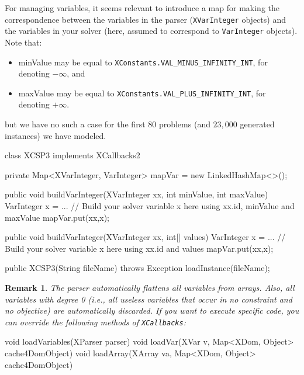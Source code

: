 \documentclass[10pt]{article}
\newenvironment{boxabsc}
               {\medskip \begin{bclogo}[barre=none,arrondi=0.2,logo=]{}\vspace{-0.6cm}}
               {\vspace{-0.1cm}\end{bclogo} \smallskip}
\newtheorem{remark}{Remark}
\newcommand{\nn}[1]{{\tt #1}} %
\begin{document}
For managing variables, it seems relevant to introduce a map for making the correspondence between the variables in the parser (\nn{XVarInteger} objects) and the variables in your solver (here, assumed to correspond to \nn{VarInteger} objects).
Note that:
\begin{itemize}
\item  minValue may be equal to \nn{XConstants.VAL\_MINUS\_INFINITY\_INT}, for denoting $- \infty$, and 
\item maxValue  may be equal to \nn{XConstants.VAL\_PLUS\_INFINITY\_INT}, for denoting $+ \infty$.
\end{itemize}
but we have no such a case for the first 80 problems (and $23,000$ generated instances) we have modeled.

\begin{boxabsc}
\begin{absc}
class XCSP3 implements XCallbacks2 { 
  private Map<XVarInteger, VarInteger> mapVar = new LinkedHashMap<>();

  public void buildVarInteger(XVarInteger xx, int minValue, int maxValue) {
    VarInteger x = ...  // Build your solver variable x here using xx.id, minValue and maxValue
    mapVar.put(xx,x);  
  }

  public void buildVarInteger(XVarInteger xx, int[] values) { 
    VarInteger x = ... // Build your solver variable x here using xx.id and values
    mapVar.put(xx,x);  
  }
  
  public XCSP3(String fileName) throws Exception {
    loadInstance(fileName); 
  }
}
\end{absc} 
\end{boxabsc}


\begin{remark}
The parser automatically flattens all variables from arrays. Also, all variables with degree 0 (i.e., all useless variables that occur in no constraint and no objective) are automatically discarded. 
If you want to execute specific code, you can override the following methods of \nn{XCallbacks}:
\end{remark}
\begin{absc}
void loadVariables(XParser parser) 
void loadVar(XVar v, Map<XDom, Object> cache4DomObject)
void loadArray(XArray va, Map<XDom, Object> cache4DomObject) 
\end{absc} 
\end{document}
